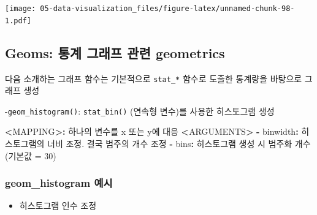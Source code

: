 \documentclass[
  11pt,
]{krantz}
\newenvironment{Shaded}{\begin{snugshade}}{\end{snugshade}}
\newcommand{\DecValTok}[1]{\textcolor[rgb]{0.06,0.06,0.06}{#1}}
\newcommand{\ErrorTok}[1]{\textcolor[rgb]{0.14,0.14,0.14}{\textbf{#1}}}
\newcommand{\NormalTok}[1]{#1}
\newcommand{\OperatorTok}[1]{\textcolor[rgb]{0.43,0.43,0.43}{\textbf{#1}}}
\newcommand{\StringTok}[1]{\textcolor[rgb]{0.5,0.5,0.5}{#1}}
\providecommand{\tightlist}{%
  \setlength{\itemsep}{0pt}\setlength{\parskip}{0pt}}
\begin{document}
\texttt{[image: 05-data-visualization\_files/figure-latex/unnamed-chunk-98-1.pdf]}

\normalsize

\hypertarget{geom-statistics}{%
\subsection{Geoms: 통계 그래프 관련 geometrics}\label{geom-statistics}}

다음 소개하는 그래프 함수는 기본적으로 \texttt{stat\_*} 함수로 도출한 통계량을 바탕으로 그래프 생성

-\texttt{geom\_histogram()}: \texttt{stat\_bin()} (연속형 변수)를 사용한 히스토그램 생성

\footnotesize

\begin{Shaded}
\begin{Highlighting}[]
\OperatorTok{<}\NormalTok{MAPPING}\OperatorTok{>}\ErrorTok{:}\StringTok{ }\NormalTok{하나의 변수를 x 또는 y에 대응}
\OperatorTok{<}\NormalTok{ARGUMENTS}\OperatorTok{>}
\StringTok{  }\OperatorTok{-}\StringTok{ }\NormalTok{binwidth}\OperatorTok{:}\StringTok{ }\NormalTok{히스토그램의 너비 조정. 결국 범주의 개수 조정}
  \OperatorTok{-}\StringTok{ }\NormalTok{bins}\OperatorTok{:}\StringTok{ }\NormalTok{히스토그램 생성 시 범주화 개수(기본값 =}\StringTok{ }\DecValTok{30}\NormalTok{)}
\end{Highlighting}
\end{Shaded}

\normalsize

\hypertarget{geom-hist-example}{%
\subsubsection*{geom\_histogram 예시}\label{geom-hist-example}}


\begin{itemize}
\tightlist
\item
  히스토그램 인수 조정
\end{itemize}

\footnotesize
\end{document}
